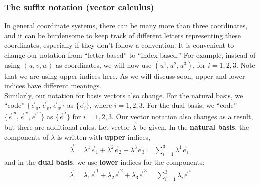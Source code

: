 \documentclass{article}
\theoremstyle{definition}
\begin{document}
\subsubsection{The suffix notation (vector calculus)}
In general coordinate systems, there can be many more than three coordinates, and it can be burdensome to keep track of different letters representing these coordinates, especially if they don't follow a convention. It is convenient to change our notation from ``letter-based'' to ``index-based.'' For example, instead of using $(u,v,w)$ as coordinates, we will now use $(u^1,u^2,u^3)$, for $i=1,2,3$. Note that we are using upper indices here. As we will discuss soon, upper and lower indices have different meanings. \\

Similarly, our notation for basis vectors also change. For the natural basis, we ``code'' $\{ \vec{e}_u, \vec{e}_v, \vec{e}_w \}$ as $\{\vec{e}_i \}$, where $i=1,2,3$. For the dual basis, we ``code'' $\{ \vec{e}^{\,u},\vec{e}^{\,v},\vec{e}^{\,w} \}$ as $\{ \vec{e}^{\,i} \}$ for $i=1,2,3$. Our vector notation also changes as a result, but there are additional rules. Let vector $\vec{\lambda}$ be given. In the \textbf{natural basis}, the components of $\lambda$ is written with \textbf{upper} indices,
\begin{align*}
\vec{\lambda} = \lambda^1\vec{e}_1 + \lambda^2\vec{e}_2 + \lambda^3\vec{e}_3 = \sum_{i=1}^{3}\lambda^1\vec{e}_i.
\end{align*} 
and in the \textbf{dual basis}, we use \textbf{lower} indices for the components:
\begin{align*}
\vec{\lambda} = \lambda_1\vec{e}^{\,1} + \lambda_2\vec{e}^{\,2} + \lambda_3\vec{e}^{\,3} = \sum_{i=1}^{3}\lambda_i\vec{e}^{\,i}
\end{align*}
\end{document}
